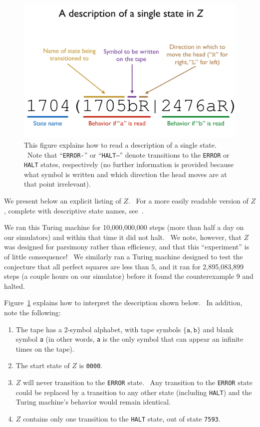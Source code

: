 \documentclass[11pt]{article}
\newcommand{\zhaltstate}{\texttt{7593}}
\begin{document}
\begin{appendices}
\begin{figure}[h]
\begin{center}
\includegraphics[scale=0.4]{figs/syntax.png}
\caption{This figure explains how to read a description of a single state. \ Note that ``\texttt{ERROR-}'' or ``\texttt{HALT--}'' denote transitions to the \texttt{ERROR} or \texttt{HALT} states, respectively (no further information is provided because what symbol is written and which direction the head moves are at that point irrelevant). \label{fig:syntax}}
\end{center}
\end{figure}

We present below an explicit listing of $Z$. \ For a more easily readable version of $Z$, complete with descriptive state names, see~\cite{github}.

We ran this Turing machine for 10,000,000,000 steps (more than half a day on our simulators) and within that time it did not halt. \ We note, however, that $Z$ was designed for parsimony rather than efficiency, and that this ``experiment'' is of little consequence! \ We similarly ran a Turing machine designed to test the conjecture that all perfect squares are less than $5$, and it ran for 2,895,083,899 steps (a couple hours on our simulator) before it found the counterexample $9$ and halted.

Figure~\ref{fig:syntax} explains how to interpret the description shown below. \ In addition, note the following:

\begin{enumerate}

\item The tape has a $2$-symbol alphabet, with tape symbols $\{\texttt{a}, \texttt{b}\}$ and blank symbol \texttt{a} (in other words, \texttt{a} is the only symbol that can appear an infinite times on the tape).
\item The start state of $Z$ is \texttt{0000}.
\item $Z$ will never transition to the \texttt{ERROR} state. \ Any transition to the \texttt{ERROR} state could be replaced by a transition to any other state (including \texttt{HALT}) and the Turing machine's behavior would remain identical.
\item $Z$ contains only one transition to the \texttt{HALT} state, out of state \zhaltstate.


\end{enumerate}
\end{appendices}
\end{document}
